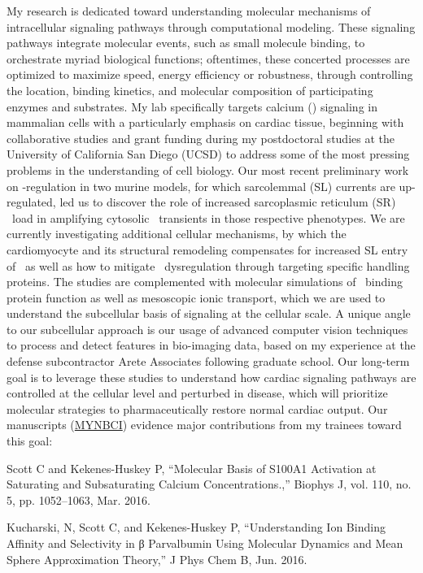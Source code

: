 My research is dedicated toward understanding molecular mechanisms of intracellular signaling pathways through computational modeling. 
These signaling pathways integrate molecular events, such as small molecule binding, to orchestrate myriad biological functions; oftentimes, these concerted processes are optimized to maximize speed, energy efficiency or robustness, through controlling the location, binding kinetics, and molecular composition of participating enzymes and substrates. 
My lab specifically targets calcium (\catwo) signaling in mammalian cells with a particularly emphasis on cardiac tissue, beginning with collaborative studies and grant funding during my postdoctoral studies at the University of California San Diego (UCSD) to address some of the most pressing problems in the understanding of cell biology.
Our most recent preliminary work on \catwo-regulation in two murine models, for which sarcolemmal (SL) currents are up-regulated, led us to discover the role of increased sarcoplasmic reticulum (SR) \catwo\ load in amplifying cytosolic \catwo\ transients in those respective phenotypes. 
We are currently investigating additional cellular mechanisms, by which the cardiomyocyte and its structural remodeling compensates for increased SL entry of \catwo\, as well as how to mitigate \catwo\ dysregulation through targeting specific \catwo\-handling proteins. The studies are complemented with molecular simulations of \catwo\ binding protein function as well as mesoscopic ionic transport, which we are used to understand the subcellular basis of signaling at the cellular scale. 
A unique angle to our subcellular approach is our usage of advanced computer vision techniques to process and detect features in bio-imaging data, based on my experience at the defense subcontractor Arete Associates following graduate school. 
Our long-term goal is to leverage these studies to understand how cardiac signaling pathways are controlled at the cellular level and perturbed in disease, which will prioritize molecular strategies to pharmaceutically restore normal cardiac output. 
Our manuscripts 
% 
(\href{https://www.ncbi.nlm.nih.gov/sites/myncbi/1TY9bcXrU0YAs/bibliography/43451609/public/?sort=date&direction=ascending}{MYNBCI}) 
evidence major contributions from my trainees toward this goal:
\lbn
\item Scott C and Kekenes-Huskey P, “Molecular Basis of S100A1 Activation at Saturating and Subsaturating Calcium Concentrations.,” Biophys J, vol. 110, no. 5, pp. 1052–1063, Mar. 2016.
\item Kucharski, N, Scott C, and Kekenes-Huskey P, “Understanding Ion Binding Affinity and Selectivity in β Parvalbumin Using Molecular Dynamics and Mean Sphere Approximation Theory,” J Phys Chem B, Jun. 2016.
